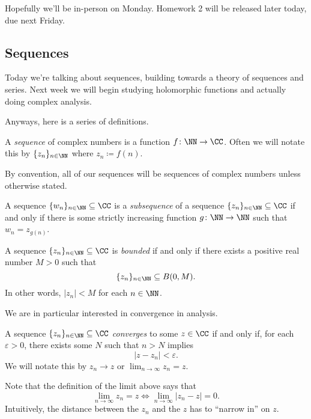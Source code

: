 
Hopefully we'll be in-person on Monday. Homework 2 will be released later today, due next Friday.

\subsection{Sequences}
Today we're talking about sequences, building towards a theory of sequences and series. Next week we will begin studying holomorphic functions and actually doing complex analysis.

Anyways, here is a series of definitions.
\begin{definition}[Sequence]
	A \textit{sequence} of complex numbers is a function $f\colon\NN\to\CC$. Often we will notate this by $\{z_n\}_{n\in\NN}$ where $z_n\coloneqq f(n)$.
\end{definition}
By convention, all of our sequences will be sequences of complex numbers unless otherwise stated.
\begin{definition}[Subsequence]
	A sequence $\{w_n\}_{n\in\NN}\subseteq\CC$ is a \textit{subsequence} of a sequence $\{z_n\}_{n\in\NN}\subseteq\CC$ if and only if there is some strictly increasing function $g\colon\NN\to\NN$ such that $w_n=z_{g(n)}$.
\end{definition}
\begin{definition}[Bounded]
	A sequence $\{z_n\}_{n\in\NN}\subseteq\CC$ is \textit{bounded} if and only if there exists a positive real number $M>0$ such that
	\[\{z_n\}_{n\in\NN}\subseteq B(0,M).\]
	In other words, $|z_n|<M$ for each $n\in\NN$.
\end{definition}
We are in particular interested in convergence in analysis.
\begin{definition}[Converges]
	A sequence $\{z_n\}_{n\in\NN}\subseteq\CC$ \textit{converges} to some $z\in\CC$ if and only if, for each $\varepsilon>0$, there exists some $N$ such that $n>N$ implies
	\[|z-z_n|<\varepsilon.\]
	We will notate this by $z_n\to z$ or $\lim_{n\to\infty}z_n=z$.
\end{definition}
Note that the definition of the limit above says that
\[\lim_{n\to\infty}z_n=z\iff\lim_{n\to\infty}|z_n-z|=0.\]
Intuitively, the distance between the $z_n$ and the $z$ has to ``narrow in'' on $z$. %


